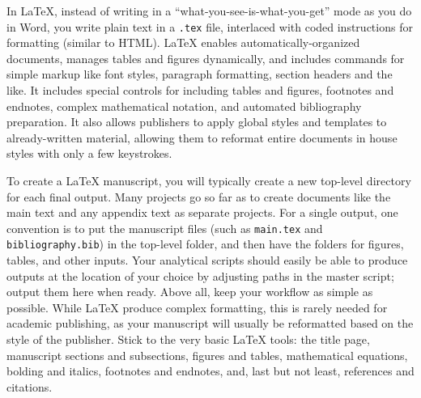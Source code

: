 In {\LaTeX}, instead of writing in a
``what-you-see-is-what-you-get'' mode as you do in Word,
you write plain text in a \texttt{.tex} file,
interlaced with coded instructions for formatting (similar to HTML).
{\LaTeX} enables automatically-organized documents,
manages tables and figures dynamically,
and includes commands for simple markup
like font styles, paragraph formatting, section headers and the like.
It includes special controls for including tables and figures,
footnotes and endnotes, complex mathematical notation, and automated bibliography preparation.
It also allows publishers to apply global styles and templates to already-written material,
allowing them to reformat entire documents in house styles with only a few keystrokes.

To create a {\LaTeX} manuscript,
you will typically create a new top-level directory for each final output.
Many projects go so far as to create documents like the main text
and any appendix text as separate projects.
For a single output, one convention is to put the manuscript files
(such as \texttt{main.tex} and \texttt{bibliography.bib})
in the top-level folder,
and then have the folders for figures, tables, and other inputs.
Your analytical scripts should easily be able to produce outputs
at the location of your choice by adjusting paths in the master script;
output them here when ready.
Above all, keep your workflow as simple as possible.
While {\LaTeX}  produce complex formatting,
this is rarely needed for academic publishing,
as your manuscript will usually be reformatted
based on the style of the publisher.
Stick to the very basic {\LaTeX} tools:
the title page, manuscript sections and subsections,
figures and tables, mathematical equations,
bolding and italics, footnotes and endnotes,
and, last but not least, references and citations.

